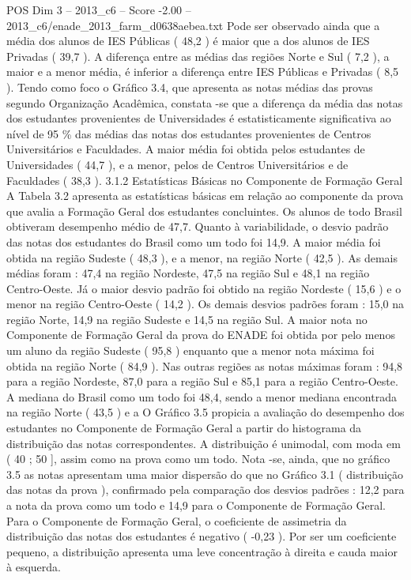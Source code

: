 \begin{textsample}{POS Dim 3 – 2013\_c6 – Score -2.00 – 2013\_c6/enade\_2013\_farm\_d0638aebea.txt}
Pode ser observado ainda que a média dos alunos de IES Públicas ( 48,2 ) é maior que a dos alunos de IES Privadas ( 39,7 ).
A diferença entre as médias das regiões Norte e Sul ( 7,2 ), a maior e a menor média, é inferior a diferença entre IES Públicas e Privadas ( 8,5 ).
Tendo como foco o Gráfico 3.4, que apresenta as notas médias das provas segundo Organização Acadêmica, constata -se que a diferença da média das notas dos estudantes provenientes de Universidades é estatisticamente significativa ao nível de 95 \% das médias das notas dos estudantes provenientes de Centros Universitários e Faculdades.
A maior média foi obtida pelos estudantes de Universidades ( 44,7 ), e a menor, pelos de Centros Universitários e de Faculdades ( 38,3 ). 3.1.2 Estatísticas Básicas no Componente de Formação Geral A Tabela 3.2 apresenta as estatísticas básicas em relação ao componente da prova que avalia a Formação Geral dos estudantes concluintes.
Os alunos de todo Brasil obtiveram desempenho médio de 47,7.
Quanto à variabilidade, o desvio padrão das notas dos estudantes do Brasil como um todo foi 14,9.
A maior média foi obtida na região Sudeste ( 48,3 ), e a menor, na região Norte ( 42,5 ).
As demais médias foram : 47,4 na região Nordeste, 47,5 na região Sul e 48,1 na região Centro-Oeste.
Já o maior desvio padrão foi obtido na região Nordeste ( 15,6 ) e o menor na região Centro-Oeste ( 14,2 ).
Os demais desvios padrões foram : 15,0 na região Norte, 14,9 na região Sudeste e 14,5 na região Sul.
A maior nota no Componente de Formação Geral da prova do ENADE foi obtida por pelo menos um aluno da região Sudeste ( 95,8 ) enquanto que a menor nota máxima foi obtida na região Norte ( 84,9 ).
Nas outras regiões as notas máximas foram : 94,8 para a região Nordeste, 87,0 para a região Sul e 85,1 para a região Centro-Oeste.
A mediana do Brasil como um todo foi 48,4, sendo a menor mediana encontrada na região Norte ( 43,5 ) e a O Gráfico 3.5 propicia a avaliação do desempenho dos estudantes no Componente de Formação Geral a partir do histograma da distribuição das notas correspondentes.
A distribuição é unimodal, com moda em ( 40 ; 50 ], assim como na prova como um todo.
Nota -se, ainda, que no gráfico 3.5 as notas apresentam uma maior dispersão do que no Gráfico 3.1 ( distribuição das notas da prova ), confirmado pela comparação dos desvios padrões : 12,2 para a nota da prova como um todo e 14,9 para o Componente de Formação Geral.
Para o Componente de Formação Geral, o coeficiente de assimetria da distribuição das notas dos estudantes é negativo ( -0,23 ).
Por ser um coeficiente pequeno, a distribuição apresenta uma leve concentração à direita e cauda maior à esquerda.

\end{textsample}
